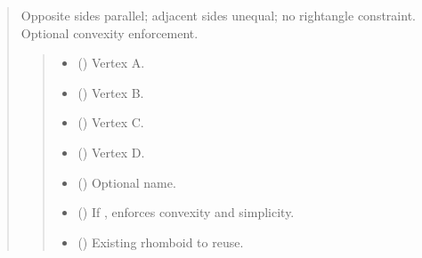\documentclass[letterpaper,10pt,english]{sphinxmanual}
\begin{document}
\begin{quote}
\begin{fulllineitems}
\begin{fulllineitems}
\sphinxAtStartPar
Opposite sides parallel; adjacent sides unequal; no right\sphinxhyphen{}angle
constraint. Optional convexity enforcement.
\begin{quote}\begin{description}
\begin{itemize}
\item {} 
\sphinxAtStartPar
{} (\sphinxstyleliteralemphasis{\sphinxupquote{ | }}) \textendash{} Vertex A.

\item {} 
\sphinxAtStartPar
{} (\sphinxstyleliteralemphasis{\sphinxupquote{ | }}) \textendash{} Vertex B.

\item {} 
\sphinxAtStartPar
{} (\sphinxstyleliteralemphasis{\sphinxupquote{ | }}) \textendash{} Vertex C.

\item {} 
\sphinxAtStartPar
{} (\sphinxstyleliteralemphasis{\sphinxupquote{ | }}) \textendash{} Vertex D.

\item {} 
\sphinxAtStartPar
{} (\sphinxstyleliteralemphasis{\sphinxupquote{ | }}) \textendash{} Optional name.

\item {} 
\sphinxAtStartPar
{} () \textendash{} If , enforces convexity and simplicity.

\item {} 
\sphinxAtStartPar
{} (\sphinxstyleliteralemphasis{\sphinxupquote{ | }}) \textendash{} Existing rhomboid to reuse.


\end{itemize}
\end{description}
\end{quote}
\end{fulllineitems}
\end{fulllineitems}
\end{quote}
\end{document}
